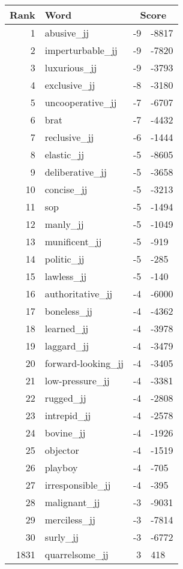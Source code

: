\begin{longtable}[!htbp]{| rlr@{.}l |}
    \hline
    \textbf{Rank} & \textbf{Word} & \multicolumn{2}{c|}{\textbf{Score}} \\
    \hline
    \endhead
    1 & abusive\_jj & -9 & -8817 \\
    2 & imperturbable\_jj & -9 & -7820 \\
    3 & luxurious\_jj & -9 & -3793 \\
    4 & exclusive\_jj & -8 & -3180 \\
    5 & uncooperative\_jj & -7 & -6707 \\
    6 & brat & -7 & -4432 \\
    7 & reclusive\_jj & -6 & -1444 \\
    8 & elastic\_jj & -5 & -8605 \\
    9 & deliberative\_jj & -5 & -3658 \\
    10 & concise\_jj & -5 & -3213 \\
    11 & sop & -5 & -1494 \\
    12 & manly\_jj & -5 & -1049 \\
    13 & munificent\_jj & -5 & -919 \\
    14 & politic\_jj & -5 & -285 \\
    15 & lawless\_jj & -5 & -140 \\
    16 & authoritative\_jj & -4 & -6000 \\
    17 & boneless\_jj & -4 & -4362 \\
    18 & learned\_jj & -4 & -3978 \\
    19 & laggard\_jj & -4 & -3479 \\
    20 & forward-looking\_jj & -4 & -3405 \\
    21 & low-pressure\_jj & -4 & -3381 \\
    22 & rugged\_jj & -4 & -2808 \\
    23 & intrepid\_jj & -4 & -2578 \\
    24 & bovine\_jj & -4 & -1926 \\
    25 & objector & -4 & -1519 \\
    26 & playboy & -4 & -705 \\
    27 & irresponsible\_jj & -4 & -395 \\
    28 & malignant\_jj & -3 & -9031 \\
    29 & merciless\_jj & -3 & -7814 \\
    30 & surly\_jj & -3 & -6772 \\
    1831 & quarrelsome\_jj & 3 & 418 \\

\end{longtable}
